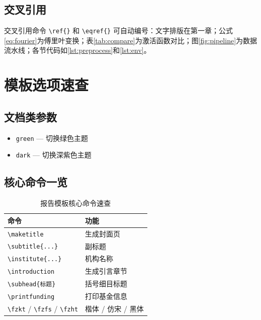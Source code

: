 \documentclass{harryopo-report}
\begin{document}
\section{交叉引用}

交叉引用命令 \verb|\ref{}| 和 \verb|\eqref{}| 可自动编号：文字排版在第一章；公式\eqref{eq:fourier}为傅里叶变换；表\ref{tab:compare}为激活函数对比；图\ref{fig:pipeline}为数据流水线；各节代码如\ref{lst:preprocess}和\ref{lst:env}。

\chapter{模板选项速查}

\section{文档类参数}

\begin{itemize}
    \item \verb|green| — 切换绿色主题
    \item \verb|dark| — 切换深紫色主题
\end{itemize}

\section{核心命令一览}

\begin{table}[htbp]
\centering
\begin{tabular}{lp{7cm}}
\toprule
\textbf{命令} & \textbf{功能} \\
\midrule
\verb|\maketitle| & 生成封面页 \\
\verb|\subtitle{...}| & 副标题 \\
\verb|\institute{...}| & 机构名称 \\
\verb|\introduction| & 生成引言章节 \\
\verb|\subhead{标题}| & 括号细目标题 \\
\verb|\printfunding| & 打印基金信息 \\
\verb|\fzkt| / \verb|\fzfs| / \verb|\fzht| & 楷体 / 仿宋 / 黑体 \\
\bottomrule
\end{tabular}
\caption{报告模板核心命令速查}
\end{table}
\end{document}

